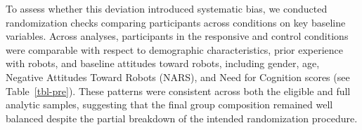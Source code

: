 \documentclass[
  authoryear,
  doubleblind,
  3p]{elsarticle}
\begin{document}
To assess whether this deviation introduced systematic bias, we
conducted randomization checks comparing participants across conditions
on key baseline variables. Across analyses, participants in the
responsive and control conditions were comparable with respect to
demographic characteristics, prior experience with robots, and baseline
attitudes toward robots, including gender, age, Negative Attitudes
Toward Robots (NARS), and Need for Cognition scores (see
Table~\ref{tbl-pre})\citep{cacioppo1982}. These patterns were consistent
across both the eligible and full analytic samples, suggesting that the
final group composition remained well balanced despite the partial
breakdown of the intended randomization procedure.

\begin{table}

\caption{\label{tbl-pre}Baseline participant characteristics by
interaction policy (full sample)}

\centering{

}
\end{table}
\end{document}
